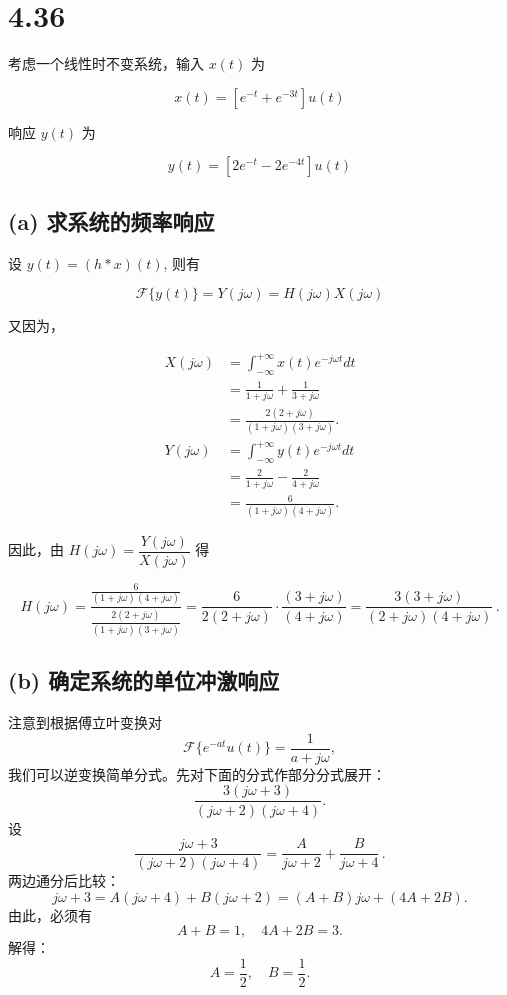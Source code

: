 \documentclass[11pt]{article}
\begin{document}
    \section{4.36}\label{section}

考虑一个线性时不变系统，输入 \(x(t)\) 为

\[
x(t) = \left[e^{-t} + e^{-3t}\right]u(t)
\]

响应 \(y(t)\) 为

\[
y(t) = \left[2e^{-t}- 2e^{-4t}\right]u(t)
\]

\subsection{(a)
求系统的频率响应}\label{a-ux6c42ux7cfbux7edfux7684ux9891ux7387ux54cdux5e94}

设 \(y(t) = (h*x)(t)\), 则有

\[
\mathcal{F}\{y(t)\} = Y(j\omega) = H(j\omega)X(j\omega)
\]

又因为，

\[
\begin{aligned}
X(j\omega) &= \int_{-\infty}^{+\infty}x(t)e^{-j\omega t}dt \\
&= \frac{1}{1+j\omega} + \frac{1}{3+j\omega}\\
&=\frac{2(2+j\omega)}{(1+j\omega)(3+j\omega)}.
\\
Y(j\omega)
&= \int_{-\infty}^{+\infty}y(t)e^{-j\omega t}dt \\
&= \frac{2}{1+j\omega} - \frac{2}{4+j\omega}\\
&=\frac{6}{(1+j\omega)(4+j\omega)}.
\end{aligned}
\]

因此，由 \(H(j\omega)= \dfrac{Y(j\omega)}{X(j\omega)}\) 得

\[\boxed{
H(j\omega)=\frac{\frac{6}{(1+j\omega)(4+j\omega)}}
{\frac{2(2+j\omega)}{(1+j\omega)(3+j\omega)}}
=\frac{6}{2(2+j\omega)}\cdot\frac{(3+j\omega)}{(4+j\omega)}
=\frac{3(3+j\omega)}{(2+j\omega)(4+j\omega)}\,.}
\]

\subsection{(b)
确定系统的单位冲激响应}\label{b-ux786eux5b9aux7cfbux7edfux7684ux5355ux4f4dux51b2ux6fc0ux54cdux5e94}

注意到根据傅立叶变换对 \[
\mathcal{F}\{e^{-at}u(t)\}=\frac{1}{a+j\omega},
\] 我们可以逆变换简单分式。先对下面的分式作部分分式展开： \[
\frac{3(j\omega+3)}{(j\omega+2)(j\omega+4)}.
\] 设 \[
\frac{j\omega+3}{(j\omega+2)(j\omega+4)}
=\frac{A}{j\omega+2} + \frac{B}{j\omega+4}\,.
\] 两边通分后比较： \[
j\omega+3 = A(j\omega+4)+B(j\omega+2) = (A+B)j\omega + (4A+2B).
\] 由此，必须有 \[
A+B=1,\quad 4A+2B=3.
\] 解得： \[
A = \frac{1}{2}, \quad B=\frac{1}{2}.
\]
\end{document}
